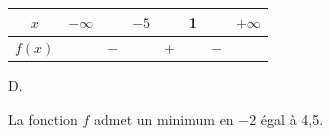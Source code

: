 \documentclass[10pt]{article}
\begin{document}
\smallskip
\begin{center}
\begin{tabular}{|c|l m{0.5cm}c m{0.5cm}c m{0.5cm} r|}
\hline
$x$&$-\infty$& &$-5$&&1&&$+\infty$\\ \hline
$f(x)$&&\centering $-$&&\centering +&&\centering $-$&\\
\hline
\end{tabular}
\end{center}

\begin{center}
D.
\end{center}
La fonction $f$ admet un minimum en $-2$ égal à 4,5.

\vspace{0,5cm}
\end{document}
